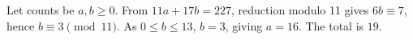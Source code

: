 Let counts be $a,b\ge0$. From $11a+17b=227$, reduction modulo 11 gives $6b\equiv7$, hence $b\equiv3\pmod{11}$. As $0\le b\le13$, $b=3$, giving $a=16$. The total is $\boxed{19}$.
